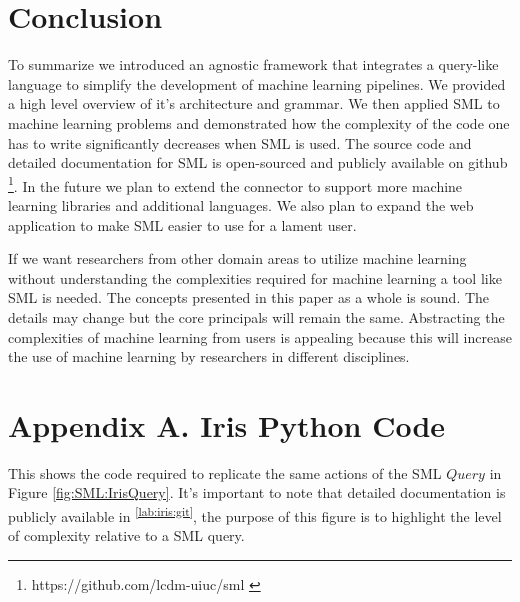 \documentclass[jair,twoside,11pt,theapa]{article}
\begin{document}
\section{Conclusion}
\label{conclusion}
To summarize we introduced an agnostic framework that integrates a query-like language to simplify the development of machine learning pipelines. We provided a high level overview of it's architecture and grammar. We then applied SML to machine learning problems and demonstrated how the complexity of the code one has to write significantly decreases when SML is used. The source code and detailed documentation for SML is open-sourced and publicly available on github \footnote{https://github.com/lcdm-uiuc/sml \label{SML:Github}}. In the future we plan to extend the connector to support more machine learning libraries and additional languages. We also plan to expand the web application to make SML easier to use for a lament user.

If we want researchers from other domain areas to utilize machine learning without understanding the complexities required for machine learning a tool like SML is needed. The concepts presented in this paper as a whole is sound. The details may change but the core principals will remain the same. Abstracting the complexities of machine learning from users is appealing because this will increase the use of machine learning by researchers in different disciplines.



\appendix
\section*{Appendix A. Iris Python Code}
This shows the code required to replicate the same actions of the SML \(Query\) in Figure \ref{fig:SML:IrisQuery}. It's important to note that detailed documentation is publicly available in \textsuperscript{\ref{lab:iris:git}}, the purpose of this figure is to highlight the level of complexity relative to a SML query.
\end{document}
